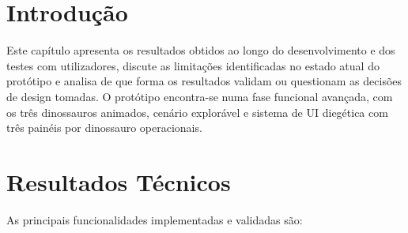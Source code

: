 \documentclass[a4paper,11pt]{report}
\begin{document}
\section{Introdução}

Este capítulo apresenta os resultados obtidos ao longo do desenvolvimento e
dos testes com utilizadores, discute as limitações identificadas no estado
atual do protótipo e analisa de que forma os resultados validam ou questionam
as decisões de design tomadas. O protótipo encontra-se numa fase funcional
avançada, com os três dinossauros animados, cenário explorável e sistema de
UI diegética com três painéis por dinossauro operacionais.

\section{Resultados Técnicos}

As principais funcionalidades implementadas e validadas são:
\end{document}
